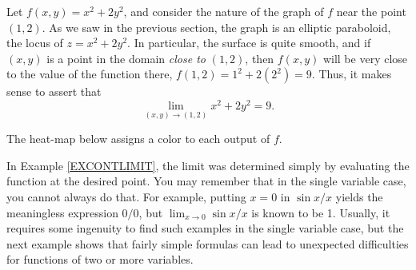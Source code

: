 \begin{example}
	\label{EXCONTLIMIT}
	Let $f(x,y) = x^2 + 2y^2$, and consider the
	nature of the graph of $f$  near the point $(1,2)$.  As
	we saw in the previous section, the graph is an elliptic paraboloid,
	the locus of $z = x^2 + 2y^2$.
	In particular, the surface is quite smooth, and if $(x,y)$ is
	a point in the domain \emph{close to} $(1,2)$, then $f(x,y)$
	will be very close to the value of the function there, $f(1,2) =
	1^2 + 2(2^2) = 9$.   Thus, it makes sense to assert that
	\[
	 \lim_{(x,y)\to (1,2)} x^2 + 2y^2 = 9.
	\]

	The heat-map below assigns a color to each output of $f$.
	\begin{center}
	\end{center}
\end{example}

In Example \ref{EXCONTLIMIT}, the limit was determined simply by evaluating the
function at the desired point.  You may remember that in the single
variable case, you cannot always do that.
For example, putting $x = 0$ in  $\sin x/x$ yields the meaningless
expression $0/0$, but $\lim_{x \to 0} \sin x/x$ is known to be 1.
Usually, it requires some ingenuity to find such examples in the single
variable case, but the next example shows that fairly simple formulas
can lead to unexpected difficulties for functions of two or more
variables.


